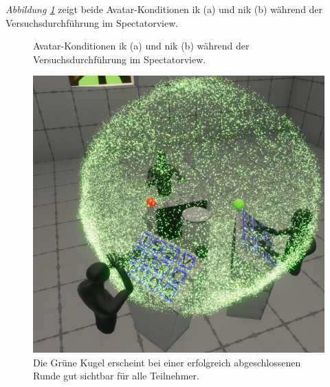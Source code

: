 \documentclass[a4paper,11pt]{article}%
\renewcommand{\\}{\vspace*{0.5\baselineskip} \newline}
\begin{document}
\textit{Abbildung \ref{AvatareImEinsatz}} zeigt beide Avatar-Konditionen \ac{ik} (a) und \ac{nik} (b) während der Versuchsdurchführung im Spectatorview.
\newpage

\begin{figure}[h]
  \centering
  \qquad
  \caption[Die Avatare und der Spectatorview]{Avatar-Konditionen \ac{ik} (a) und \ac{nik} (b) während der Versuchsdurchführung im Spectatorview.}
  \label{AvatareImEinsatz}
\end{figure}

\begin{figure}[H]
		\begin{footnotesize}
		\centering
			\includegraphics[scale=0.2]{Abbildungen/RoundSuccsessful.JPG}	
			\caption[Der Abschluss einer Runde]{Die Grüne Kugel erscheint bei einer erfolgreich abgeschlossenen Runde gut sichtbar für alle Teilnehmer.}
			\label{RoundFinished}
		\end{footnotesize}
	\end{figure}
	
\end{document}

